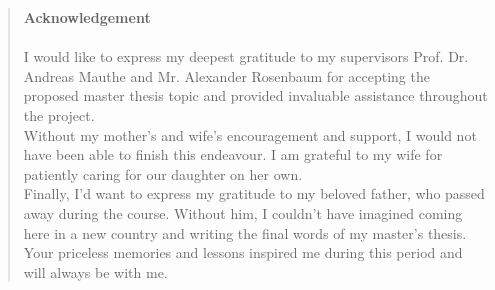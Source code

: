 
\pagestyle{plain}


\begin{quote}
	\textbf{\Large Acknowledgement}\\\\
I would like to express my deepest gratitude to my supervisors Prof$.$ Dr$.$ Andreas Mauthe and Mr$.$ Alexander Rosenbaum for accepting the proposed master thesis topic and provided invaluable assistance throughout the project. \\
Without my mother's and wife's encouragement and support, I would not have been able to finish this endeavour. I am grateful to my wife for patiently caring for our daughter on her own. \\
Finally, I'd want to express my gratitude to my beloved father, who passed away during the course. Without him, I couldn't have imagined coming here in a new country and writing the final words of my master's thesis. Your priceless memories and lessons inspired me during this period and will always be with me. \\
    
\end{quote}
